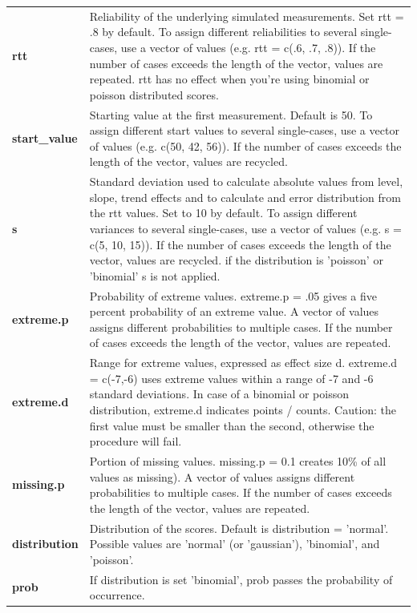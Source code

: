 \documentclass[
]{book}
\begin{document}
\begin{table}
\begin{tabular}[t]{>{\raggedright\arraybackslash}p{15em}>{\raggedright\arraybackslash}p{30em}}
\textbf{rtt} & Reliability of the underlying simulated measurements. Set rtt = .8 by default. To assign different reliabilities to several single-cases, use a vector of values (e.g. rtt = c(.6, .7, .8)). If the number of cases exceeds the length of the vector, values are repeated. rtt has no effect when you're using binomial or poisson distributed scores.\\
\textbf{start\_value} & Starting value at the first measurement. Default is 50. To assign different start values to several single-cases, use a vector of values (e.g. c(50, 42, 56)). If the number of cases exceeds the length of the vector, values are recycled.\\
\textbf{s} & Standard deviation used to calculate absolute values from level, slope, trend effects and to calculate and error distribution from the rtt values. Set to 10 by default. To assign different variances to several single-cases, use a vector of values (e.g. s = c(5, 10, 15)). If the number of cases exceeds the length of the vector, values are recycled. if the distribution is 'poisson' or 'binomial' s is not applied.\\
\textbf{extreme.p} & Probability of extreme values. extreme.p = .05 gives a five percent probability of an extreme value. A vector of values assigns different probabilities to multiple cases. If the number of cases exceeds the length of the vector, values are repeated.\\
\textbf{extreme.d} & Range for extreme values, expressed as effect size d. extreme.d = c(-7,-6) uses extreme values within a range of -7 and -6 standard deviations. In case of a binomial or poisson distribution, extreme.d indicates points / counts. Caution: the first value must be smaller than the second, otherwise the procedure will fail.\\
\textbf{missing.p} & Portion of missing values. missing.p = 0.1 creates 10\% of all values as missing). A vector of values assigns different probabilities to multiple cases. If the number of cases exceeds the length of the vector, values are repeated.\\
\textbf{distribution} & Distribution of the scores. Default is distribution = 'normal'. Possible values are 'normal' (or 'gaussian'), 'binomial', and 'poisson'.\\
\textbf{prob} & If distribution is set 'binomial', prob passes the probability of occurrence.\\
\bottomrule
\end{tabular}
\end{table}
\end{document}
